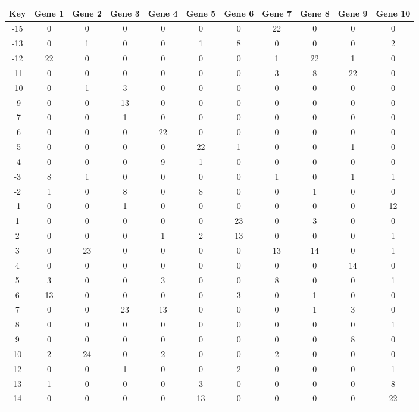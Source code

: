 \begin{tabular}{|c|c|c|c|c|c|c|c|c|c|c|}
\hline
Key & Gene 1 & Gene 2 & Gene 3 & Gene 4 & Gene 5 & Gene 6 & Gene 7 & Gene 8 & Gene 9 & Gene 10 \\
\hline
-15 & 0 & 0 & 0 & 0 & 0 & 0 & 22 & 0 & 0 & 0 \\
-13 & 0 & 1 & 0 & 0 & 1 & 8 & 0 & 0 & 0 & 2 \\
-12 & 22 & 0 & 0 & 0 & 0 & 0 & 1 & 22 & 1 & 0 \\
-11 & 0 & 0 & 0 & 0 & 0 & 0 & 3 & 8 & 22 & 0 \\
-10 & 0 & 1 & 3 & 0 & 0 & 0 & 0 & 0 & 0 & 0 \\
-9 & 0 & 0 & 13 & 0 & 0 & 0 & 0 & 0 & 0 & 0 \\
-7 & 0 & 0 & 1 & 0 & 0 & 0 & 0 & 0 & 0 & 0 \\
-6 & 0 & 0 & 0 & 22 & 0 & 0 & 0 & 0 & 0 & 0 \\
-5 & 0 & 0 & 0 & 0 & 22 & 1 & 0 & 0 & 1 & 0 \\
-4 & 0 & 0 & 0 & 9 & 1 & 0 & 0 & 0 & 0 & 0 \\
-3 & 8 & 1 & 0 & 0 & 0 & 0 & 1 & 0 & 1 & 1 \\
-2 & 1 & 0 & 8 & 0 & 8 & 0 & 0 & 1 & 0 & 0 \\
-1 & 0 & 0 & 1 & 0 & 0 & 0 & 0 & 0 & 0 & 12 \\
1 & 0 & 0 & 0 & 0 & 0 & 23 & 0 & 3 & 0 & 0 \\
2 & 0 & 0 & 0 & 1 & 2 & 13 & 0 & 0 & 0 & 1 \\
3 & 0 & 23 & 0 & 0 & 0 & 0 & 13 & 14 & 0 & 1 \\
4 & 0 & 0 & 0 & 0 & 0 & 0 & 0 & 0 & 14 & 0 \\
5 & 3 & 0 & 0 & 3 & 0 & 0 & 8 & 0 & 0 & 1 \\
6 & 13 & 0 & 0 & 0 & 0 & 3 & 0 & 1 & 0 & 0 \\
7 & 0 & 0 & 23 & 13 & 0 & 0 & 0 & 1 & 3 & 0 \\
8 & 0 & 0 & 0 & 0 & 0 & 0 & 0 & 0 & 0 & 1 \\
9 & 0 & 0 & 0 & 0 & 0 & 0 & 0 & 0 & 8 & 0 \\
10 & 2 & 24 & 0 & 2 & 0 & 0 & 2 & 0 & 0 & 0 \\
12 & 0 & 0 & 1 & 0 & 0 & 2 & 0 & 0 & 0 & 1 \\
13 & 1 & 0 & 0 & 0 & 3 & 0 & 0 & 0 & 0 & 8 \\
14 & 0 & 0 & 0 & 0 & 13 & 0 & 0 & 0 & 0 & 22 \\
\hline
\end{tabular}